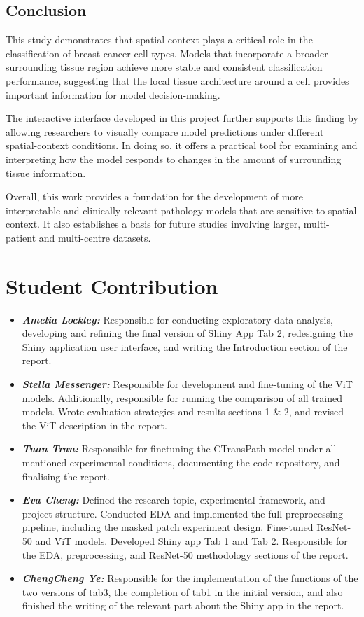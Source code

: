 \documentclass[11pt,a4paper]{article}
\begin{document}
\subsection{Conclusion}

This study demonstrates that spatial context plays a critical role in the classification of breast cancer cell types. Models that incorporate a broader surrounding tissue region achieve more stable and consistent classification performance, suggesting that the local tissue architecture around a cell provides important information for model decision-making.

The interactive interface developed in this project further supports this finding by allowing researchers to visually compare model predictions under different spatial-context conditions. In doing so, it offers a practical tool for examining and interpreting how the model responds to changes in the amount of surrounding tissue information.

Overall, this work provides a foundation for the development of more interpretable and clinically relevant pathology models that are sensitive to spatial context. It also establishes a basis for future studies involving larger, multi-patient and multi-centre datasets.

\section{Student Contribution}

\begin{itemize}
    \item \textbf{\textit{Amelia Lockley: }} Responsible for conducting exploratory data analysis, developing and refining the final version of Shiny App Tab 2, redesigning the Shiny application user interface, and writing the Introduction section of the report.
    \item \textbf{\textit{Stella Messenger: }} Responsible for development and fine-tuning of the ViT models. Additionally, responsible for running the comparison of all trained models. Wrote evaluation strategies and results sections 1 \& 2, and revised the ViT description in the report.
    \item \textbf{\textit{Tuan Tran: }} Responsible for finetuning the CTransPath model under all mentioned experimental conditions, documenting the code repository, and finalising the report. 
    \item \textbf{\textit{Eva Cheng: }} Defined the research topic, experimental framework, and project structure. Conducted EDA and implemented the full preprocessing pipeline, including the masked patch experiment design. Fine-tuned ResNet-50 and ViT models. Developed Shiny app Tab 1 and Tab 2. Responsible for the EDA, preprocessing, and ResNet-50 methodology sections of the report.
    \item \textbf{\textit{ChengCheng Ye: }}  Responsible for the implementation of the functions of the two versions of tab3, the completion of tab1 in the initial version, and also finished the writing of the relevant part about the Shiny app in the report.
\end{itemize}
\newpage


\newpage
\end{document}
